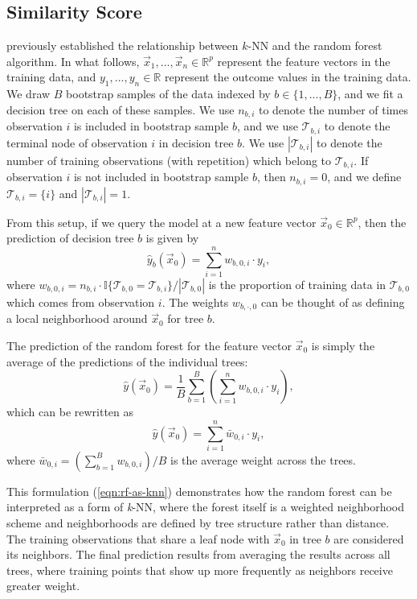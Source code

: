 \documentclass{article}
\begin{document}
\subsection{Similarity Score}

\citet{lin_random_2006} previously established the relationship between $k$-NN and the random forest algorithm. In what follows, $\vec x_1, ..., \vec x_n \in \mathbb{R}^p$ represent the feature vectors in the training data, and $y_1, ..., y_n \in \mathbb{R}$ represent the outcome values in the training data. We draw $B$ bootstrap samples of the data indexed by $b \in \{1, ..., B\}$, and we fit a decision tree on each of these samples. We use $n_{b,i}$ to denote the number of times observation $i$ is included in bootstrap sample $b$, and we use $\mathcal{T}_{b,i}$ to denote the terminal node of observation $i$ in decision tree $b$. We use $|\mathcal{T}_{b,i}|$ to denote the number of training observations (with repetition) which belong to $\mathcal{T}_{b,i}$. If observation $i$ is not included in bootstrap sample $b$, then $n_{b,i} = 0$, and we define $\mathcal{T}_{b,i} = \{i\}$ and $|\mathcal{T}_{b,i}| = 1$.

From this setup, if we query the model at a new feature vector $\vec x_0 \in \mathbb{R}^p$, then the prediction of decision tree $b$ is given by
$$
  \hat{y}_b(\vec x_0) = \sum_{i = 1}^{n} w_{b,0,i} \cdot y_i,
$$
where $w_{b,0,i} = n_{b,i} \cdot \mathbb{I}\{\mathcal{T}_{b,0} = \mathcal{T}_{b,i}\} / |\mathcal{T}_{b,0}|$ is the proportion of training data in $\mathcal{T}_{b,0}$ which comes from observation $i$. The weights $w_{b,\cdot,0}$ can be thought of as defining a local neighborhood around $\vec x_0$ for tree $b$.

The prediction of the random forest for the feature vector $\vec x_0$ is simply the average of the predictions of the individual trees:
\begin{equation*}
  \hat{y}(\vec x_0) = \frac{1}{B} \sum_{b = 1}^B \left(\sum_{i = 1}^{n} w_{b,0,i} \cdot y_i\right),
\end{equation*}
which can be rewritten as
\begin{equation}
  \label{eqn:rf-as-knn}
  \hat{y}(\vec x_0) = \sum_{i = 1}^n \bar w_{0,i} \cdot y_i,
\end{equation}
where $\bar w_{0,i} = \left(\sum_{b = 1}^B w_{b,0,i}\right) / B$ is the average weight across the trees.

This formulation (\ref{eqn:rf-as-knn}) demonstrates how the random forest can be interpreted as a form of \textit{k}-NN, where the forest itself is a weighted neighborhood scheme and neighborhoods are defined by tree structure rather than distance. The training observations that share a leaf node with $\vec x_0$ in tree $b$ are considered its neighbors. The final prediction results from averaging the results across all trees, where training points that show up more frequently as neighbors receive greater weight.
\end{document}
